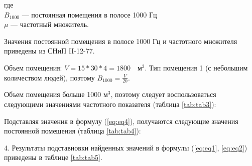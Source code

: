 \noindent где \\
$B_{1000}$ --- постоянная помещения в полосе 1000 Гц \\
$\mu$ --- частотный множитель.

Значения постоянной помещения в полосе 1000 Гц и частотного множителя приведены из СНиП II-12-77.

Объем помещения: $V = 15*30*4 = 1800 \quad \text{м}^3$. Тип помещения 1 (с небольшим количеством людей), поэтому $B_{1000} = \frac{V}{20}$.

Объем помещения больше 1000 $\text{м}^3$, поэтому следует воспользоваться следующими значениями частотного показателя (таблица \ref{tab:tab3}):

\begin{table}[H]
	\caption{Значения частотного множителя $\mu$}
	\label{tab:tab3}
	\raggedleft\tiny
\end{table}

Подставляя значения в формулу (\ref{eq:eq4}), получаются следующие значения постоянной помещения (таблица \ref{tab:tab4}):

\begin{table}[H]
	\caption{Значения постоянной помещения $B$}
	\label{tab:tab4}
	\raggedleft\tiny
\end{table}

4. Результаты подставновки найденных значений в формулы (\ref{eq:eq1}, \ref{eq:eq2}) приведены в таблице \ref{tab:tab5}.

